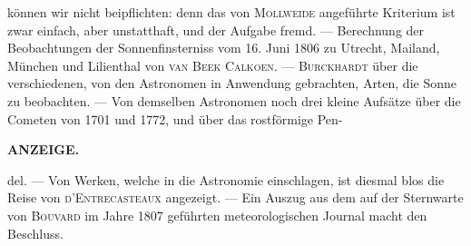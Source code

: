 können wir nicht beipflichten: denn das von \textsc{Mollweide} angeführte Kriterium ist zwar einfach, aber unstatthaft, und der Aufgabe fremd. — Berechnung der Beobachtungen der Sonnenfinsterniss vom 16. Juni 1806 zu Utrecht, Mailand, München und Lilienthal von \textsc{van Beek Calkoen}. — \textsc{Burckhardt} über die verschiedenen, von den Astronomen in Anwendung gebrachten, Arten, die Sonne zu beobachten. — Von demselben Astronomen noch drei kleine Aufsätze über die Cometen von 1701 und 1772, und über das rostförmige Pen-\par
\clearpage
{}
\noindent{}%
\parbox[b]{\dimexpr\textwidth-20mm\relax}{\centering\small\textbf{ANZEIGE.}}%
\makebox[10mm][r]{}\par\nobreak\medskip
\noindent del. — Von Werken, welche in die Astronomie einschlagen, ist diesmal blos die Reise von \textsc{d'Entrecasteaux} angezeigt. — Ein Auszug aus dem auf der Sternwarte von \textsc{Bouvard} im Jahre 1807 geführten meteorologischen Journal macht den Beschluss.
